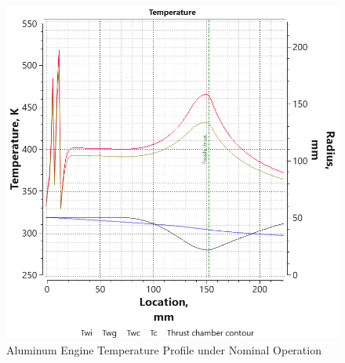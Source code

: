 \begin{figure}[H]
    \centering
    \includegraphics[width=\linewidth]{Images/tempfinal_AL_53.png}
    \caption{Aluminum Engine Temperature Profile under Nominal Operation}
    \label{fig:aluminum_temp_profile}
\end{figure}

